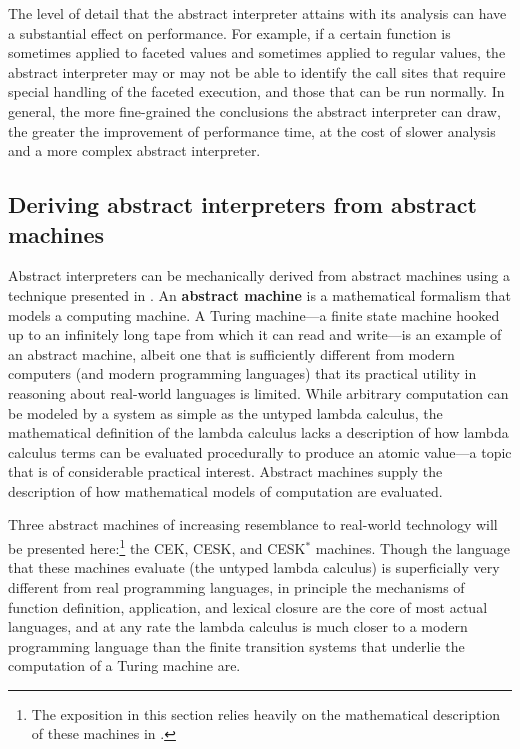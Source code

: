 \documentclass{article}
\begin{document}
The level of detail that the abstract interpreter attains with its analysis can have a substantial effect on performance. For example, if a certain function is sometimes applied to faceted values and sometimes applied to regular values, the abstract interpreter may or may not be able to identify the call sites that require special handling of the faceted execution, and those that can be run normally. In general, the more fine-grained the conclusions the abstract interpreter can draw, the greater the improvement of performance time, at the cost of slower analysis and a more complex abstract interpreter.


\subsection{Deriving abstract interpreters from abstract machines}
Abstract interpreters can be mechanically derived from abstract machines using a technique presented in \cite{aam}. An \textbf{abstract machine} is a mathematical formalism that models a computing machine. A Turing machine---a finite state machine hooked up to an infinitely long tape from which it can read and write---is an example of an abstract machine, albeit one that is sufficiently different from modern computers (and modern programming languages) that its practical utility in reasoning about real-world languages is limited. While arbitrary computation can be modeled by a system as simple as the untyped lambda calculus, the mathematical definition of the lambda calculus lacks a description of how lambda calculus terms can be evaluated procedurally to produce an atomic value---a topic that is of considerable practical interest. Abstract machines supply the description of how mathematical models of computation are evaluated.

Three abstract machines of increasing resemblance to real-world technology will be presented here:\footnote{The exposition in this section relies heavily on the mathematical description of these machines in \cite{aam}.} the CEK, CESK, and CESK$^*$ machines. Though the language that these machines evaluate (the untyped lambda calculus) is superficially very different from real programming languages, in principle the mechanisms of function definition, application, and lexical closure are the core of most actual languages, and at any rate the lambda calculus is much closer to a modern programming language than the finite transition systems that underlie the computation of a Turing machine are.
\end{document}
